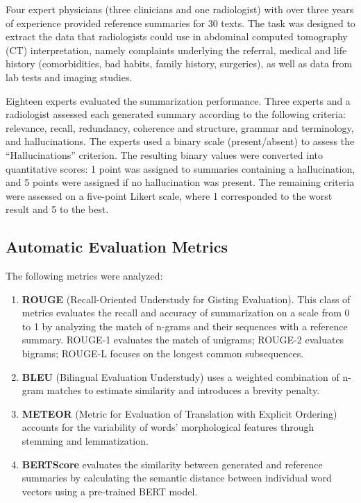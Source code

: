 \documentclass[runningheads]{llncs}
\begin{document}
Four expert physicians (three clinicians and one radiologist) with over three years of experience provided reference summaries for 30 texts. The task was designed to extract the data that radiologists could use in abdominal computed tomography (CT) interpretation, namely complaints underlying the referral, medical and life history (comorbidities, bad habits, family history, surgeries), as well as data from lab tests and imaging studies.

Eighteen experts evaluated the summarization performance. Three experts and a radiologist assessed each generated summary according to the following criteria: relevance, recall, redundancy, coherence and structure, grammar and terminology, and hallucinations. The experts used a binary scale (present/absent) to assess the ``Hallucinations'' criterion. The resulting binary values were converted into quantitative scores: 1 point was assigned to summaries containing a hallucination, and 5 points were assigned if no hallucination was present. The remaining criteria were assessed on a five-point Likert scale, where 1 corresponded to the worst result and 5 to the best.

\subsection{Automatic Evaluation Metrics}\label{subsec:metrics}

The following metrics were analyzed:
\begin{enumerate}
    \item \textbf{ROUGE} (Recall-Oriented Understudy for Gisting Evaluation). This class of metrics evaluates the recall and accuracy of summarization on a scale from 0 to 1 by analyzing the match of n-grams and their sequences with a reference summary. ROUGE-1 evaluates the match of unigrams; ROUGE-2 evaluates bigrams; ROUGE-L focuses on the longest common subsequences.
    \item \textbf{BLEU} (Bilingual Evaluation Understudy) uses a weighted combination of n-gram matches to estimate similarity and introduces a brevity penalty.
    \item \textbf{METEOR} (Metric for Evaluation of Translation with Explicit Ordering) accounts for the variability of words' morphological features through stemming and lemmatization.
    \item \textbf{BERTScore} evaluates the similarity between generated and reference summaries by calculating the semantic distance between individual word vectors using a pre-trained BERT model.
\end{enumerate}
\end{document}
